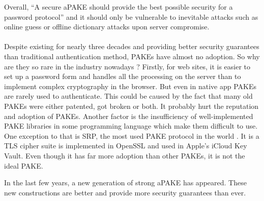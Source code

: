 ﻿\documentclass[../report.tex]{subfiles}
\begin{document}
Overall, ``A secure aPAKE should provide the best possible security for a password protocol'' \cite{OPAQUE_Standard_Draft} and it should only be vulnerable to inevitable attacks such as online guess or offline dictionary attacks upon server compromise.
\paragraph{}

Despite existing for nearly three decades and providing better security guarantees than traditional authentication method, PAKEs have almost no adoption. So why are they so rare in the industry nowadays ?
Firstly, for web sites, it is easier to set up a password form and handles all the processing on the server than to implement complex cryptography in the browser. But even in native app PAKEs are rarely used to authenticate.
This could be caused by the fact that many old PAKEs were either patented, got broken or both. %
It probably hurt the reputation and adoption of PAKEs.
Another factor is the insufficiency of well-implemented PAKE libraries in some programming language %
which make them difficult to use.
One exception to that is SRP, the most used PAKE protocol in the world \cite{PAKE_Green_blog}.
It is a TLS cipher suite is implemented in OpenSSL and used in Apple's iCloud Key Vault. Even though it has far more adoption than other PAKEs, it is not the ideal PAKE.

In the last few years, a new generation of strong aPAKE \cite{OPAQUE_Paper, KHAPE_Paper} has appeared. These new constructions are better and provide more security guarantees than ever.

\end{document}
